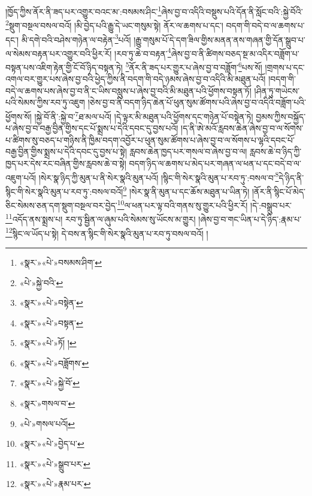 །ཁྱོད་ཀྱིས་ནོར་ནི་ཟད་པར་འགྱུར་བའང་མ་:བསམས་ཤིང་\footnote{«སྣར་»«པེ་»བསམས་ཤིག་}ཞེས་བྱ་བ་འདིའི་བསྡུས་པའི་དོན་ནི་སློང་བའི་:སྐྱེ་བོའི་\footnote{«པེ་»སྐྱེ་བའི་}སྡུག་བསྔལ་བསལ་བའོ། །མི་བྱེད་པའི་རྒྱུ་དེ་ཡང་གསུམ་སྟེ། ནོར་ལ་ཆགས་པ་དང་། བདག་གི་བདེ་བ་ལ་ཆགས་པ་དང་། མི་དགེ་བའི་བཤེས་གཉེན་ལ་བརྟེན་\footnote{«སྣར་»«པེ་»བསྟེན་}པའོ། །རྒྱུ་གསུམ་པོ་དེ་དག་ཟིལ་གྱིས་མནན་ནས་གཞན་གྱི་དོན་སྒྲུབ་པ་ལ་སེམས་བརྟན་པར་འགྱུར་བའི་ཕྱིར་རོ། །རབ་ཏུ་ཆེ་བ་བརྟན་\footnote{«སྣར་»«པེ་»བསྟན་}ཞེས་བྱ་བ་ནི་ཚིགས་བཅད་སྔ་མ་འདིར་བཟློག་པ་བསྟན་པས་འཇིག་རྟེན་གྱི་ངོ་བོ་ཉིད་བསྟན་ཏེ། \footnote{«སྣར་»«པེ་»ཏོ། ། }ནོར་ནི་ཟད་པར་གྱུར་པ་ཞེས་བྱ་བ་བཟློག་\footnote{«སྣར་»«པེ་»བཟློགས་}པས་སོ། །གྲགས་པ་དང་འགལ་བར་གྱུར་པས་ཞེས་བྱ་བའི་ཕྱེད་ཀྱིས་ནི་བདག་གི་བདེ་ཉམས་ཞེས་བྱ་བ་འདིའི་མི་མཐུན་པའོ། །བདག་གི་བདེ་ལ་ཆགས་པས་ཞེས་བྱ་བ་ནི་ང་ཡིས་བསླུས་པ་ཞེས་བྱ་བའི་མི་མཐུན་པའི་ཕྱོགས་བསྟན་ཏོ། །ཤིན་ཏུ་གཡེངས་པའི་སེམས་ཀྱིས་རབ་ཏུ་འཇུག །ཅེས་བྱ་བ་ནི་བདག་ཉིད་ཆེན་པོ་ཕུན་སུམ་ཚོགས་པའི་ཞེས་བྱ་བ་འདིའི་བཟློག་པའི་ཕྱོགས་སོ། །སྐྱེ་བོ་ནི་:སྐྱེ་བ་\footnote{«སྣར་»«པེ་»སྐྱེ་བོ་}ཐ་མལ་པའོ། །དེ་ལྟར་མི་མཐུན་པའི་ཕྱོགས་དང་གཉེན་པོ་བསྟེན་ཏེ། བྱམས་ཀྱིས་བསྐྱོད་པ་ཞེས་བྱ་བ་བརྒྱ་བྱིན་གྱིས་དང་པོ་སྨྲས་པ་དེའི་དབང་དུ་བྱས་པའོ། །ད་ནི་ཨེ་མའོ་རླབས་ཆེན་ཞེས་བྱ་བ་ལ་སོགས་པ་ཚིགས་སུ་བཅད་པ་གཉིས་ནི་ཁྱིམ་བདག་འབྱོར་པ་ཕུན་སུམ་ཚོགས་པ་ཞེས་བྱ་བ་ལ་སོགས་པ་ལྷའི་དབང་པོ་བརྒྱ་བྱིན་གྱིས་སྨྲས་པ་དེའི་དབང་དུ་བྱས་པ་སྟེ། རླབས་ཆེན་ཁྱད་པར་གསལ་བ་ཞེས་བྱ་བ་ལ། རླབས་ཆེ་བ་ཉིད་ཀྱི་ཁྱད་པར་དེས་རང་བཞིན་གྱིས་རླབས་ཆེ་བ་སྟེ། བདག་ཉིད་ལ་ཆགས་པ་མེད་པར་གཞན་ལ་ཕན་པ་དང་བདེ་བ་ལ་འཇུག་པའོ། །སེར་སྣ་ཉིད་ཀྱི་མུན་པ་ནི་སེར་སྣའི་མུན་པའོ། །སྙིང་གི་སེར་སྣའི་མུན་པ་རབ་ཏུ་:བསལ་བ་\footnote{«སྣར་»གསལ་བ་}དེ་ཉིད་ནི་སྙིང་གི་སེར་སྣའི་མུན་པ་རབ་ཏུ་:བསལ་བའོ།\footnote{«པེ་»གསལ་པའོ།} །སེར་སྣ་ནི་མུན་པ་དང་ཆོས་མཐུན་པ་ཡིན་ཏེ། །ནོར་ནི་སྙིང་པོ་མེད་ཅིང་སེམས་ཅན་དག་སྡུག་བསྔལ་བར་བྱེད་\footnote{«སྣར་»«པེ་»བྱེད་པ་}ལ་ཕན་པར་ལྟ་བའི་གནས་སུ་གྱུར་པའི་ཕྱིར་རོ། །དེ་:བསྒྲུབ་པར་\footnote{«སྣར་»«པེ་»སྒྲུབ་པར་}འདོད་ནས་སྨྲས་པ། རབ་ཏུ་སྦྱིན་ལ་ཞུམ་པའི་སེམས་སུ་ཡོངས་མ་གྱུར། །ཞེས་བྱ་བ་གང་ཡིན་པ་དེ་ཉིད་:རྣམ་པ་\footnote{«སྣར་»«པེ་»རྣམ་པར་}སྙིང་ལ་ཡོད་པ་སྟེ། དེ་བས་ན་སྙིང་གི་སེར་སྣའི་མུན་པ་རབ་ཏུ་བསལ་བའོ། །
